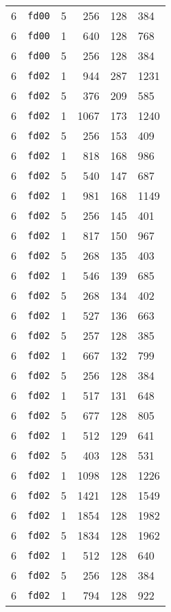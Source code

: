 \documentclass{article}
\begin{document}
\begin{table}[h!]
\begin{tabular}{llrrrl}
    6 & \texttt{fd00} & 5 & 256 & 128 & 384 \\
    6 & \texttt{fd00} & 1 & 640 & 128 & 768 \\
    6 & \texttt{fd00} & 5 & 256 & 128 & 384 \\
    6 & \texttt{fd02} & 1 & 944 & 287 & 1231 \\
    6 & \texttt{fd02} & 5 & 376 & 209 & 585 \\
    6 & \texttt{fd02} & 1 & 1067 & 173 & 1240 \\
    6 & \texttt{fd02} & 5 & 256 & 153 & 409 \\
    6 & \texttt{fd02} & 1 & 818 & 168 & 986 \\
    6 & \texttt{fd02} & 5 & 540 & 147 & 687 \\
    6 & \texttt{fd02} & 1 & 981 & 168 & 1149 \\
    6 & \texttt{fd02} & 5 & 256 & 145 & 401 \\
    6 & \texttt{fd02} & 1 & 817 & 150 & 967 \\
    6 & \texttt{fd02} & 5 & 268 & 135 & 403 \\
    6 & \texttt{fd02} & 1 & 546 & 139 & 685 \\
    6 & \texttt{fd02} & 5 & 268 & 134 & 402 \\
    6 & \texttt{fd02} & 1 & 527 & 136 & 663 \\
    6 & \texttt{fd02} & 5 & 257 & 128 & 385 \\
    6 & \texttt{fd02} & 1 & 667 & 132 & 799 \\
    6 & \texttt{fd02} & 5 & 256 & 128 & 384 \\
    6 & \texttt{fd02} & 1 & 517 & 131 & 648 \\
    6 & \texttt{fd02} & 5 & 677 & 128 & 805 \\
    6 & \texttt{fd02} & 1 & 512 & 129 & 641 \\
    6 & \texttt{fd02} & 5 & 403 & 128 & 531 \\
    6 & \texttt{fd02} & 1 & 1098 & 128 & 1226 \\
    6 & \texttt{fd02} & 5 & 1421 & 128 & 1549 \\
    6 & \texttt{fd02} & 1 & 1854 & 128 & 1982 \\
    6 & \texttt{fd02} & 5 & 1834 & 128 & 1962 \\
    6 & \texttt{fd02} & 1 & 512 & 128 & 640 \\
    6 & \texttt{fd02} & 5 & 256 & 128 & 384 \\
    6 & \texttt{fd02} & 1 & 794 & 128 & 922 \\

\end{tabular}
\end{table}
\end{document}
